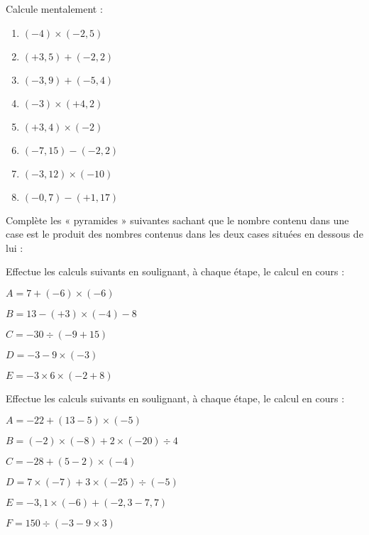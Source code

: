 \begin{exercice}Calcule mentalement :
\begin{enumerate}
\item $(-4) \times (-2,5)$
\item $(+3,5) +(-2,2)$
\item $(-3,9) +(-5,4)$
\item $(-3) \times (+4,2)$
\item $(+3,4) \times (-2)$
\item $(-7,15) -(-2,2)$
\item $(-3,12) \times (-10)$
\item $(-0,7) -(+1,17)$
\end{enumerate}
\end{exercice}



\begin{exercice}Complète les « pyramides » suivantes sachant que le nombre contenu dans une case est le produit des nombres contenus dans les deux cases situées en dessous de lui :
\begin{center}
\end{center}
\end{exercice}


\newpage
\begin{exercice}Effectue les calculs suivants en soulignant, à chaque étape, le calcul en cours :

$A = 7 +(-6) \times (-6)$

$B = 13 -(+3) \times (-4) -8$

$C = -30 \div (-9 +15)$

$D = -3 -9 \times (-3)$

$E = -3 \times 6 \times (-2 +8)$
\end{exercice}



\begin{exercice}Effectue les calculs suivants en soulignant, à chaque étape, le calcul en cours :

$A = -22 +(13 -5) \times (-5)$

$B = (-2) \times (-8) +2 \times (-20) \div 4$

$C = -28 +(5 -2) \times (-4)$

$D = 7 \times (-7) +3 \times (-25) \div (-5)$

$E = -3,1 \times (-6) +(-2,3 -7,7)$

$F = 150 \div (-3 -9 \times 3)$
\end{exercice}



